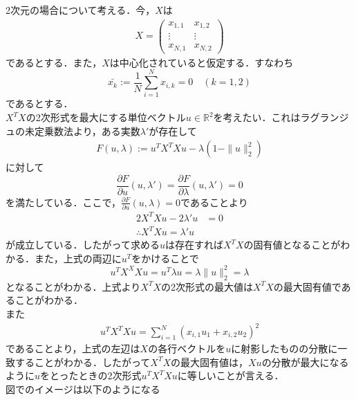 \documentclass{jsarticle}
\theoremstyle{definition}
\theoremstyle{mystyle} %
\begin{document}
\large
2次元の場合について考える．今，$X$は
\begin{align*}
X=\begin{pmatrix}
x_{1,1} & x_{1,2}\\
\vdots & \vdots \\
x_{N,1} & x_{N,2}
\end{pmatrix}
\end{align*}
であるとする．また，$X$は中心化されていると仮定する．すなわち
$$\bar{x_k}:=\frac{1}{N}\sum_{i=1}^Nx_{i,k}=0\quad(k=1,2)$$
であるとする．\\

$X^TX$の2次形式を最大にする単位ベクトル$u\in\mathbb{R}^2$を考えたい．これはラグランジュの未定乗数法より，ある実数$\lambda'$が存在して
\begin{align*}
F(u,\lambda):=u^TX^TXu-\lambda(1-\|u\|_2^2)
\end{align*}
に対して
$$\frac{\partial F}{\partial u}(u,\lambda')=\frac{\partial F}{\partial \lambda}(u,\lambda')=0$$
を満たしている．ここで，$\displaystyle \frac{\partial F}{\partial u}(u,\lambda)=0$であることより
\begin{align*}
2X^TXu-2\lambda 'u&=0\\
\therefore X^TXu=\lambda' u
\end{align*}
が成立している．したがって求める$u$は存在すれば$X^TX$の固有値となることがわかる．また，上式の両辺に$u^T$をかけることで
$$u^TX^XXu=u^T \lambda u=\lambda\|u\|_2^2=\lambda$$
となることがわかる．上式より$X^TX$の2次形式の最大値は$X^TX$の最大固有値であることがわかる．\\

また
\begin{align*}
u^T X^TXu=\sum_{i=1}^N(x_{i,1}u_1+x_{i,2}u_2)^2
\end{align*}
であることより，上式の左辺は$X$の各行ベクトルを$u$に射影したものの分散に一致することがわかる．したがって$X^TX$の最大固有値は，$Xu$の分散が最大になるように$u$をとったときの2次形式$u^TX^TXu$に等しいことが言える．\\

図でのイメージは以下のようになる
\end{document}
